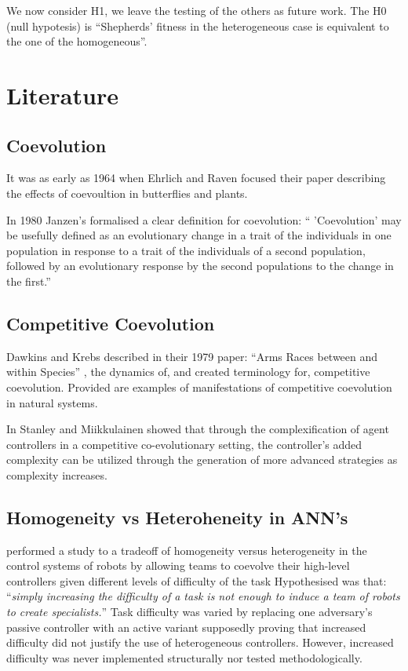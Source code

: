 \documentclass[conference]{IEEEtran}
\begin{document}
We now consider H1, we leave the testing of the others as future work. The H0 (null hypotesis) is “Shepherds’ fitness in the heterogeneous case is equivalent to the one of the homogeneous”.


\section{Literature}
 

\subsection{Coevolution}
It was as early as 1964 when Ehrlich and Raven focused their paper \cite{ehrlich1964butterflies} describing the effects of coevoultion in butterflies and plants.

In 1980 Janzen's \cite{janzen1980coevolution} formalised a clear definition for coevolution:
`` 'Coevolution' may be usefully defined as an evolutionary change in a trait of the individuals in one population in response to a trait of the individuals of a second population, followed by an evolutionary response by the second populations to the change in the first.''


\subsection{Competitive Coevolution}
Dawkins and Krebs described in their 1979 paper: ``Arms Races between and within Species'' \cite{dawkins1979arms}, the dynamics of, and created terminology for, competitive coevolution. Provided are examples of manifestations of competitive coevolution in natural systems.

In \cite{stanley2004competitive} Stanley and Miikkulainen showed that through the complexification of agent controllers in a competitive co-evolutionary setting, the controller's added complexity can be utilized through the generation of more advanced strategies as complexity increases.


\subsection{Homogeneity vs Heteroheneity in ANN's}
\cite{potter2001heterogeneity} performed a study to a tradeoff of homogeneity versus heterogeneity in the control systems of robots by allowing teams to coevolve their high-level controllers given different levels of difficulty of the task
Hypothesised was that: ``\textit{simply increasing the difficulty of a task is not enough to induce a team of robots to create specialists.}''
Task difficulty was varied by replacing one adversary's passive controller with an active variant supposedly proving that increased difficulty did not justify the use of heterogeneous controllers.
However, increased difficulty was never implemented structurally nor tested methodologically. 
\end{document}
